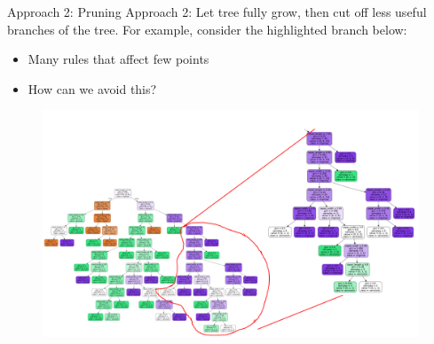 \documentclass[aspectratio=169]{../latex_main/tntbeamer}  %
\begin{document}
	
	\begin{frame}{Approach 2: Pruning}
	    Approach 2: Let tree fully grow, then cut off less useful branches of the tree. For example, consider the highlighted branch below:
	    \begin{itemize}
	        \item Many rules that affect few points
	        \item How can we avoid this?
	    \end{itemize}
	    \begin{figure}
	        \centering
	        \includegraphics[scale=.25]{Bild53}
	    \end{figure}
	\end{frame}
	
\end{document}

